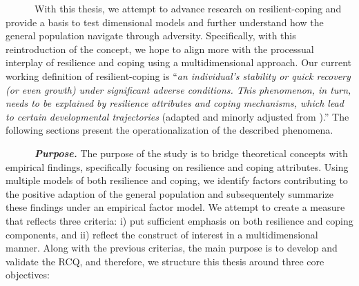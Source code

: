 \documentclass[
  man,floatsintext]{apa7}
\begin{document}
~~~~~~With this thesis, we attempt to advance research on resilient-coping and provide a basis to test dimensional models and further understand how the general population navigate through adversity. Specifically, with this reintroduction of the concept, we hope to align more with the processual interplay of resilience and coping using a multidimensional approach. Our current working definition of resilient-coping is ``\emph{an individual's stability or quick recovery (or even growth) under significant adverse conditions. This phenomenon, in turn, needs to be explained by resilience attributes and coping mechanisms, which lead to certain developmental trajectories} (adapted and minorly adjusted from ).'' The following sections present the operationalization of the described phenomena.

~~~~~~\textbf{\emph{Purpose.}} The purpose of the study is to bridge theoretical concepts with empirical findings, specifically focusing on resilience and coping attributes. Using multiple models of both resilience and coping, we identify factors contributing to the positive adaption of the general population and subsequentely summarize these findings under an empirical factor model. We attempt to create a measure that reflects three criteria: i) put sufficient emphasis on both resilience and coping components, and ii) reflect the construct of interest in a multidimensional manner. Along with the previous criterias, the main purpose is to develop and validate the RCQ, and therefore, we structure this thesis around three core objectives:
\end{document}
